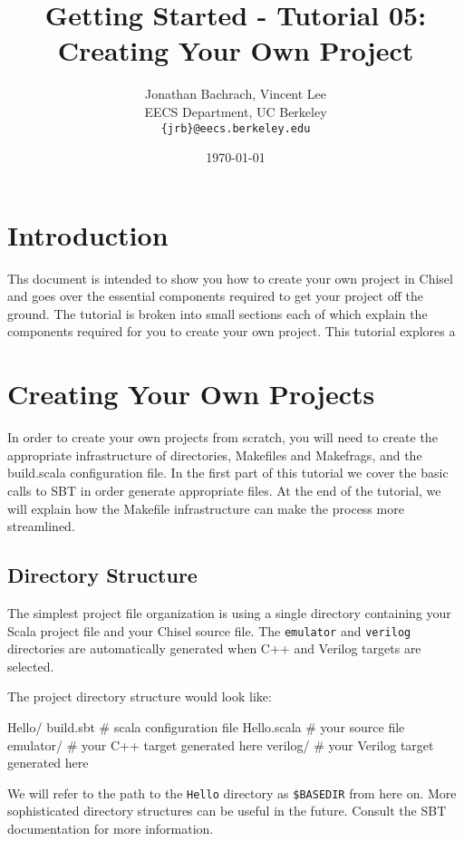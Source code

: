 \documentclass[twocolumn, 10pt]{article}
\title{Getting Started - Tutorial 05: Creating Your Own Project}
\author{Jonathan Bachrach, Vincent Lee \\
EECS Department, UC Berkeley\\
{\tt  \{jrb\}@eecs.berkeley.edu}
}
\date{\today}
\begin{document}
\maketitle{}

\section{Introduction}

Ths document is intended to show you how to create your own project in Chisel and goes over the essential components required to get your project off the ground.  The tutorial is broken into small sections each of which explain the components required for you to create your own project. This tutorial explores a 

\section{Creating Your Own Projects}

In order to create your own projects from scratch, you will need to create the appropriate infrastructure of directories, Makefiles and Makefrags, and the build.scala configuration file. In the first part of this tutorial we cover the basic calls to SBT in order generate appropriate files. At the end of the tutorial, we will explain how the Makefile infrastructure can make the process more streamlined.

\subsection{Directory Structure}

The simplest project file organization is using a single directory containing your Scala project file and your Chisel source file. The \verb+emulator+ and \verb+verilog+ directories are automatically generated when C++ and Verilog targets are selected. 

The project directory structure would look like:

\begin{bash}
Hello/
  build.sbt   # scala configuration file
  Hello.scala # your source file
  emulator/   # your C++ target generated here
  verilog/    # your Verilog target generated here
\end{bash}

We will refer to the path to the \verb+Hello+ directory as \verb+$BASEDIR+ from here on.  More sophisticated directory structures can be useful in the future.  Consult the SBT documentation for more information.
\end{document}
